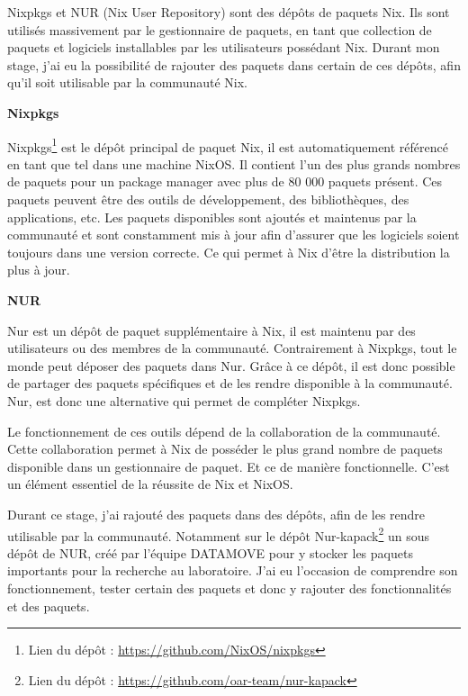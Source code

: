 \documentclass[a4paper,french,12pt, titlepage]{article}
\begin{document}
Nixpkgs et NUR (Nix User Repository) sont des dépôts de paquets Nix. Ils
sont utilisés massivement par le gestionnaire de paquets, en tant que
collection de paquets et logiciels installables par les utilisateurs
possédant Nix. Durant mon stage, j'ai eu la possibilité de rajouter des
paquets dans certain de ces dépôts, afin qu'il soit utilisable par la
communauté Nix.\newline

\textbf{Nixpkgs}\newline

Nixpkgs\footnote{Lien du dépôt : \url{https://github.com/NixOS/nixpkgs}}
est le dépôt principal de paquet Nix, il est automatiquement référencé
en tant que tel dans une machine NixOS. Il contient l'un des plus grands
nombres de paquets pour un package manager avec plus de 80 000 paquets
présent. Ces paquets peuvent être des outils de développement, des
bibliothèques, des applications, etc. Les paquets disponibles sont
ajoutés et maintenus par la communauté et sont constamment mis à jour
afin d'assurer que les logiciels soient toujours dans une version
correcte. Ce qui permet à Nix d'être la distribution la plus à
jour.\newline

\textbf{NUR}\newline

Nur est un dépôt de paquet supplémentaire à Nix, il est maintenu par des
utilisateurs ou des membres de la communauté. Contrairement à Nixpkgs,
tout le monde peut déposer des paquets dans Nur. Grâce à ce dépôt, il
est donc possible de partager des paquets spécifiques et de les rendre
disponible à la communauté. Nur, est donc une alternative qui permet de
compléter Nixpkgs.\newline

Le fonctionnement de ces outils dépend de la collaboration de la
communauté. Cette collaboration permet à Nix de posséder le plus grand
nombre de paquets disponible dans un gestionnaire de paquet. Et ce de
manière fonctionnelle. C'est un élément essentiel de la réussite de Nix
et NixOS.\newline

Durant ce stage, j'ai rajouté des paquets dans des dépôts, afin de les
rendre utilisable par la communauté. Notamment sur le dépôt
Nur-kapack\footnote{Lien du dépôt : \url{https://github.com/oar-team/nur-kapack}}
un sous dépôt de NUR, créé par l'équipe DATAMOVE pour y stocker les
paquets importants pour la recherche au laboratoire. J'ai eu l'occasion
de comprendre son fonctionnement, tester certain des paquets et donc y
rajouter des fonctionnalités et des paquets.
\end{document}
